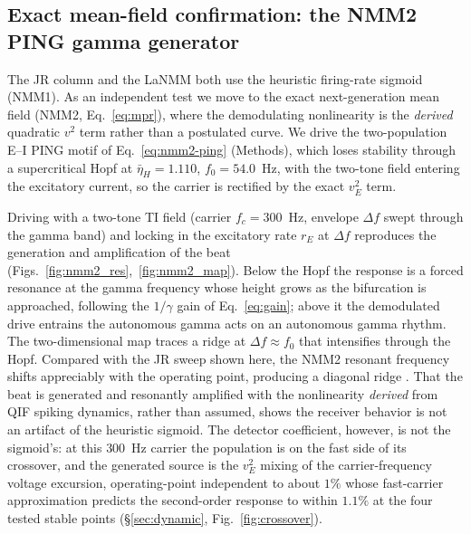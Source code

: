 \documentclass[11pt,a4paper]{article}
\providecommand{\DIFaddtex}[1]{{\protect\color{blue} \sf #1}} %
\providecommand{\DIFdeltex}[1]{{\protect\color{red} \scriptsize #1}} %
\providecommand{\DIFaddbegin}{} %
\providecommand{\DIFaddend}{} %
\providecommand{\DIFdelbegin}{} %
\providecommand{\DIFdelend}{} %
\providecommand{\DIFadd}[1]{\texorpdfstring{\DIFaddtex{#1}}{#1}} %
\providecommand{\DIFdel}[1]{\texorpdfstring{\DIFdeltex{#1}}{}} %
\begin{document}
\subsection{Exact mean-field confirmation: the NMM2 PING gamma generator}\label{sec:nmm2-results}
The JR column and the LaNMM both use the heuristic firing-rate sigmoid (NMM1). As an
independent test we move to the exact next-generation mean field (NMM2,
Eq.~\eqref{eq:mpr}), where the demodulating nonlinearity is the \emph{derived}
quadratic $v^2$ term rather than a postulated curve. We drive the two-population E--I PING motif of
Eq.~\eqref{eq:nmm2-ping} (Methods), which loses stability through a supercritical
Hopf at $\bar\eta_H=1.110$, $f_0=54.0$~Hz, with the two-tone field entering the
excitatory current,
so the carrier is rectified by the exact $v_E^2$ term.

Driving with a two-tone TI field (carrier $f_c=300$~Hz, envelope $\Delta f$ swept through
the gamma band) and locking in the excitatory rate $r_E$ at $\Delta f$ reproduces the
generation and amplification of the beat (Figs.~\ref{fig:nmm2_res},~\ref{fig:nmm2_map}). Below the Hopf the
response is a forced resonance at the gamma frequency whose height grows as the
bifurcation is approached, following the $1/\gamma$ gain of Eq.~\eqref{eq:gain}; above it the
demodulated drive \DIFdelbegin \DIFdel{entrains the autonomous gamma }\DIFdelend \DIFaddbegin \DIFadd{acts on an autonomous gamma rhythm}\DIFaddend . The two-dimensional map traces a
ridge at $\Delta f\!\approx\!f_0$ that intensifies through the Hopf. Compared with the
JR sweep shown here, the NMM2 resonant frequency shifts appreciably with the
operating point, producing a diagonal ridge \cite{clusella2023}. That the beat is generated and resonantly amplified with the nonlinearity
\emph{derived} from QIF spiking dynamics, rather than assumed, shows the receiver behavior
is not an artifact of the heuristic sigmoid. The detector coefficient, however, is not the
sigmoid's: at this $300$~Hz carrier the population is on the fast side of its crossover,
and the generated source is the $v_E^2$ mixing of the carrier-frequency voltage excursion,
\DIFdelbegin \DIFdel{operating-point independent to about $1\%$ }\DIFdelend \DIFaddbegin \DIFadd{whose fast-carrier approximation predicts the second-order response to within
$1.1\%$ at the four tested stable points }\DIFaddend (\S\ref{sec:dynamic}, Fig.~\ref{fig:crossover}).
\end{document}
